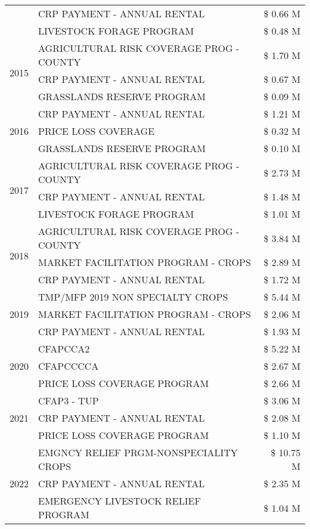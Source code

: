 \begin{tabular}{llr}
 & CRP PAYMENT - ANNUAL RENTAL & \$ 0.66 M \\
 & LIVESTOCK FORAGE PROGRAM & \$ 0.48 M \\
\cline{1-3}
\multirow[t]{3}{*}{2015} & AGRICULTURAL RISK COVERAGE PROG - COUNTY & \$ 1.70 M \\
 & CRP PAYMENT - ANNUAL RENTAL & \$ 0.67 M \\
 & GRASSLANDS RESERVE PROGRAM & \$ 0.09 M \\
\cline{1-3}
\multirow[t]{3}{*}{2016} & CRP PAYMENT - ANNUAL RENTAL & \$ 1.21 M \\
 & PRICE LOSS COVERAGE & \$ 0.32 M \\
 & GRASSLANDS RESERVE PROGRAM & \$ 0.10 M \\
\cline{1-3}
\multirow[t]{3}{*}{2017} & AGRICULTURAL RISK COVERAGE PROG - COUNTY & \$ 2.73 M \\
 & CRP PAYMENT - ANNUAL RENTAL & \$ 1.48 M \\
 & LIVESTOCK FORAGE PROGRAM & \$ 1.01 M \\
\cline{1-3}
\multirow[t]{3}{*}{2018} & AGRICULTURAL RISK COVERAGE PROG - COUNTY & \$ 3.84 M \\
 & MARKET FACILITATION PROGRAM - CROPS & \$ 2.89 M \\
 & CRP PAYMENT - ANNUAL RENTAL & \$ 1.72 M \\
\cline{1-3}
\multirow[t]{3}{*}{2019} & TMP/MFP 2019 NON SPECIALTY CROPS & \$ 5.44 M \\
 & MARKET FACILITATION PROGRAM - CROPS & \$ 2.06 M \\
 & CRP PAYMENT - ANNUAL RENTAL & \$ 1.93 M \\
\cline{1-3}
\multirow[t]{3}{*}{2020} & CFAPCCA2 & \$ 5.22 M \\
 & CFAPCCCCA & \$ 2.67 M \\
 & PRICE LOSS COVERAGE PROGRAM & \$ 2.66 M \\
\cline{1-3}
\multirow[t]{3}{*}{2021} & CFAP3 - TUP & \$ 3.06 M \\
 & CRP PAYMENT - ANNUAL RENTAL & \$ 2.08 M \\
 & PRICE LOSS COVERAGE PROGRAM & \$ 1.10 M \\
\cline{1-3}
\multirow[t]{3}{*}{2022} & EMGNCY RELIEF PRGM-NONSPECIALITY CROPS & \$ 10.75 M \\
 & CRP PAYMENT - ANNUAL RENTAL & \$ 2.35 M \\
 & EMERGENCY LIVESTOCK RELIEF PROGRAM & \$ 1.04 M \\
\cline{1-3}
\bottomrule
\end{tabular}
